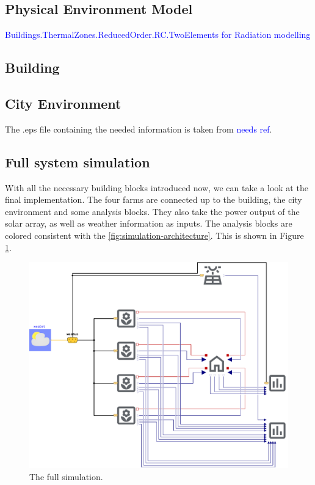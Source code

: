 \subsection{Physical Environment Model}

\textcolor{Blue}{Buildings.ThermalZones.ReducedOrder.RC.TwoElements for Radiation modelling}

\subsection{Building}

\subsection{City Environment}
The .eps file containing the needed information is taken from \textcolor{Blue}{needs ref}.

\subsection{Full system simulation}
With all the necessary building blocks introduced now, we can take a look at the final implementation.
The four farms are connected up to the building, the city environment and some analysis blocks.
They also take the power output of the solar array, as well as weather information as inputs.
The analysis blocks are colored consistent with the \ref{fig:simulation-architecture}.
This is shown in Figure \ref{fig:system}.

\begin{figure}[htbp]
  \centering
  \includegraphics[width=\textwidth]{img/simulation/system.pdf}
  \caption{The full simulation.}
  \label{fig:system}
\end{figure}

